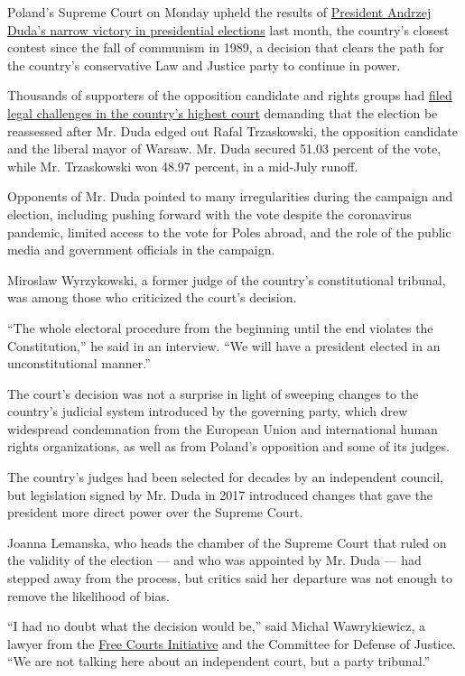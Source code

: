 Poland's Supreme Court on Monday upheld the results of
\href{https://nyti.ms/2DtNZAe}{President Andrzej Duda's narrow victory
in presidential elections} last month, the country's closest contest
since the fall of communism in 1989, a decision that clears the path for
the country's conservative Law and Justice party to continue in power.

Thousands of supporters of the opposition candidate and rights groups
had
\href{https://www.nytimes3xbfgragh.onion/2020/07/16/world/europe/poland-election.html}{filed
legal challenges in the country's highest court} demanding that the
election be reassessed after Mr. Duda edged out Rafal Trzaskowski, the
opposition candidate and the liberal mayor of Warsaw. Mr. Duda secured
51.03 percent of the vote, while Mr. Trzaskowski won 48.97 percent, in a
mid-July runoff.

Opponents of Mr. Duda pointed to many irregularities during the campaign
and election, including pushing forward with the vote despite the
coronavirus pandemic, limited access to the vote for Poles abroad, and
the role of the public media and government officials in the campaign.

Miroslaw Wyrzykowski, a former judge of the country's constitutional
tribunal, was among those who criticized the court's decision.

``The whole electoral procedure from the beginning until the end
violates the Constitution,'' he said in an interview. ``We will have a
president elected in an unconstitutional manner.''

The court's decision was not a surprise in light of sweeping changes to
the country's judicial system introduced by the governing party, which
drew widespread condemnation from the European Union and international
human rights organizations, as well as from Poland's opposition and some
of its judges.

The country's judges had been selected for decades by an independent
council, but legislation signed by Mr. Duda in 2017 introduced changes
that gave the president more direct power over the Supreme Court.

Joanna Lemanska, who heads the chamber of the Supreme Court that ruled
on the validity of the election --- and who was appointed by Mr. Duda
--- had stepped away from the process, but critics said her departure
was not enough to remove the likelihood of bias.

``I had no doubt what the decision would be,'' said Michal Wawrykiewicz,
a lawyer from the
\href{https://www.facebookcorewwwi.onion/WolneSady/}{Free Courts
Initiative} and the Committee for Defense of Justice. ``We are not
talking here about an independent court, but a party tribunal.''

